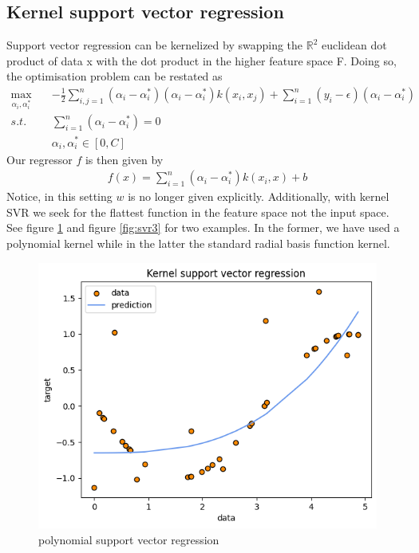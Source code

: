 \subsection{Kernel support vector regression}
Support vector regression can be kernelized by swapping the $\mathbb{R}^2$ euclidean dot product of data x with the dot product in the higher feature space F. Doing so, the optimisation problem can be restated as
\begin{equation}
    \begin{aligned}
        \max_{\alpha_i, \alpha_i^*} \quad& -\frac{1}{2}\sum\limits_{i,j=1}^n(\alpha_i-\alpha_i^*)(\alpha_i-\alpha_i^*)k(x_i, x_j)+\sum\limits_{i=1}^n(y_i-\epsilon)(\alpha_i-\alpha_i^*)
        \\
        s.t. \quad& \sum\limits_{i=1}^n(\alpha_i-\alpha_i^*)=0
        \\
        \quad& \alpha_i, \alpha_i^* \in [0,C]
    \end{aligned}
\end{equation}
Our regressor $f$ is then given by
\begin{equation}
    \begin{aligned}
        f(x)=\sum\limits_{i=1}^n(\alpha_i-\alpha_i^*)k(x_i, x)+b
    \end{aligned}
\end{equation}
Notice, in this setting $w$ is no longer given explicitly. Additionally, with kernel SVR we seek for the flattest function in the feature space not the input space.
See figure \ref{fig:svr2} and figure \ref{fig:svr3} for two examples. In the former, we have used a polynomial kernel while in the latter the standard radial basis function kernel.
\begin{figure}
    \includegraphics[width=\textwidth]{images/svr2.png}
    \caption{polynomial support vector regression}
    \label{fig:svr2}
\end{figure}

